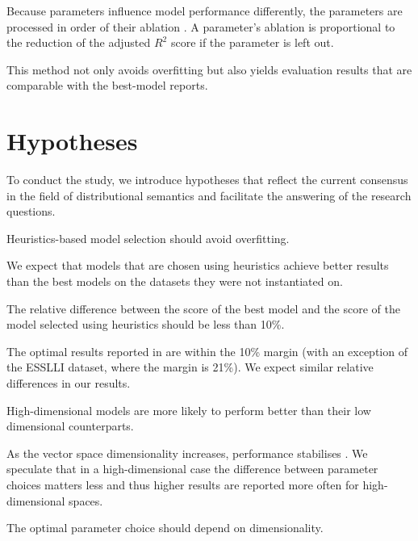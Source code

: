 Because parameters influence model performance differently, the parameters are processed in order of their ablation \cite{lapesa2014large}. A parameter's ablation is proportional to the reduction of the adjusted $R^2$ score if the parameter is left out.

This method not only avoids overfitting but also yields evaluation results that are comparable with the best-model reports.

\section{Hypotheses}
\label{sec:hypotheses}

To conduct the study, we introduce hypotheses that reflect the current consensus in the field of distributional semantics and facilitate the answering of the research questions.

\begin{hyp}
\label{hyp:overfitting}
Heuristics-based model selection should avoid overfitting.
\end{hyp}

We expect that models that are chosen using heuristics achieve better results than the best models on the datasets they were not instantiated on.

\begin{hyp}
\label{hyp:10percent}
The relative difference between the score of the best model and the score of the model selected using heuristics should be less than 10\%.
\end{hyp}

The optimal results reported in  are within the 10\% margin (with an exception of the ESSLLI dataset, where the margin is 21\%). We expect similar relative differences in our results.

\begin{hyp}
\label{hyp:var}
High-dimensional models are more likely to perform better than their low dimensional counterparts.
\end{hyp}

As the vector space dimensionality increases, performance stabilises \cite{kiela-clark:2014:CVSC,BullinariaLevy2012,lapesa2014large}. We speculate that in a high-dimensional case the difference between parameter choices matters less and thus higher results are reported more often for high-dimensional spaces.

\begin{hyp}
\label{hyp:dimen}
The optimal parameter choice should depend on dimensionality.
\end{hyp}

